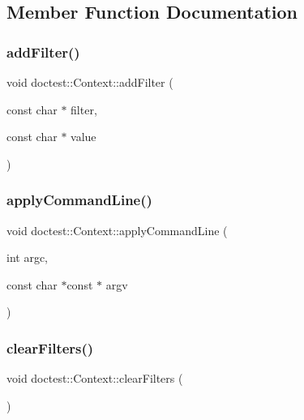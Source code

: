 \subsection{Member Function Documentation}
\mbox{\label{classdoctest_1_1Context_a60ad57a46c19db2b142468c3acac448a}} 
\subsubsection{\texorpdfstring{add\+Filter()}{addFilter()}}
{\footnotesize\ttfamily void doctest\+::\+Context\+::add\+Filter (\begin{DoxyParamCaption}\item[{const char $\ast$}]{filter,  }\item[{const char $\ast$}]{value }\end{DoxyParamCaption})}

\mbox{\label{classdoctest_1_1Context_ad55229220bf9ca74e6e0c6323bf672e1}} 
\subsubsection{\texorpdfstring{apply\+Command\+Line()}{applyCommandLine()}}
{\footnotesize\ttfamily void doctest\+::\+Context\+::apply\+Command\+Line (\begin{DoxyParamCaption}\item[{int}]{argc,  }\item[{const char $\ast$const $\ast$}]{argv }\end{DoxyParamCaption})}

\mbox{\label{classdoctest_1_1Context_aaa878723e89310d5aa3f516bc7ab3165}} 
\subsubsection{\texorpdfstring{clear\+Filters()}{clearFilters()}}
{\footnotesize\ttfamily void doctest\+::\+Context\+::clear\+Filters (\begin{DoxyParamCaption}{ }\end{DoxyParamCaption})}

